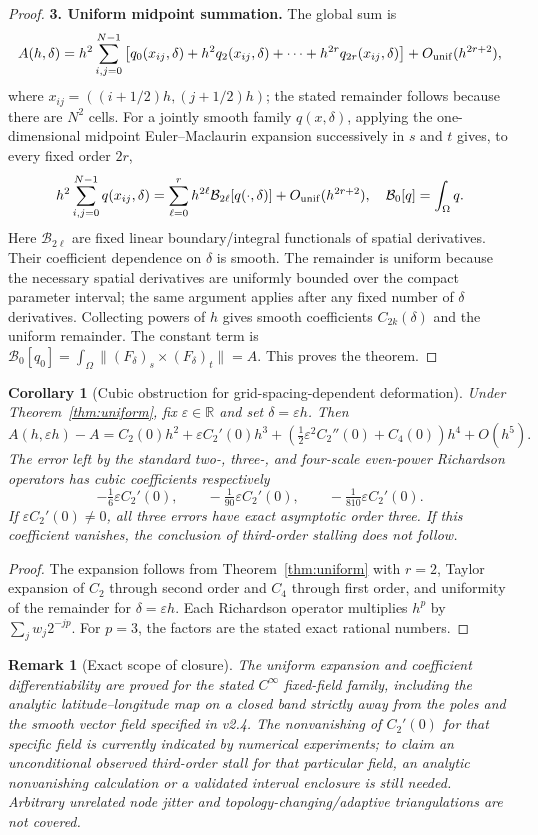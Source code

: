\documentclass[11pt]{article}
\newtheorem{corollary}{Corollary}
\newtheorem{remark}{Remark}
\begin{document}
\begin{proof}
\textbf{3. Uniform midpoint summation.} The global sum is
\[
A(h,\delta)=h^2\sum_{i,j=0}^{N-1}\left[q_0(x_{ij},\delta)+h^2q_2(x_{ij},\delta)+\cdots+h^{2r}q_{2r}(x_{ij},\delta)\right]+O_{\rm unif}(h^{2r+2}),
\]
where $x_{ij}=((i+1/2)h,(j+1/2)h)$; the stated remainder follows because there are $N^2$ cells. For a jointly smooth family $q(x,\delta)$, applying the one-dimensional midpoint Euler--Maclaurin expansion successively in $s$ and $t$ gives, to every fixed order $2r$,
\[
h^2\sum_{i,j=0}^{N-1}q(x_{ij},\delta)
=\sum_{\ell=0}^{r}h^{2\ell}\mathcal B_{2\ell}[q(\cdot,\delta)]+O_{\rm unif}(h^{2r+2}),\quad \mathcal B_0[q]=\int_\Omega q.
\]
Here $\mathcal B_{2\ell}$ are fixed linear boundary/integral functionals of spatial derivatives. Their coefficient dependence on $\delta$ is smooth. The remainder is uniform because the necessary spatial derivatives are uniformly bounded over the compact parameter interval; the same argument applies after any fixed number of $\delta$ derivatives.
Collecting powers of $h$ gives smooth coefficients $C_{2k}(\delta)$ and the uniform remainder. The constant term is $\mathcal B_0[q_0]=\int_\Omega\|(F_\delta)_s\times(F_\delta)_t\|=A$. This proves the theorem.
\end{proof}

\begin{corollary}[Cubic obstruction for grid-spacing-dependent deformation]\label{cor:cubic}
Under Theorem~\ref{thm:uniform}, fix $\varepsilon\in\mathbb R$ and set $\delta=\varepsilon h$. Then
\[
A(h,\varepsilon h)-A=C_2(0)h^2+\varepsilon C_2'(0)h^3+
\left(\tfrac12\varepsilon^2C_2''(0)+C_4(0)\right)h^4+O(h^5).
\]
The error left by the standard two-, three-, and four-scale even-power Richardson operators has cubic coefficients respectively
\[
-\tfrac16\varepsilon C_2'(0),\qquad -\tfrac1{90}\varepsilon C_2'(0),\qquad-\tfrac1{810}\varepsilon C_2'(0).
\]
If $\varepsilon C_2'(0)\ne0$, all three errors have \emph{exact} asymptotic order three. If this coefficient vanishes, the conclusion of third-order stalling does not follow.
\end{corollary}
\begin{proof}
The expansion follows from Theorem~\ref{thm:uniform} with $r=2$, Taylor expansion of $C_2$ through second order and $C_4$ through first order, and uniformity of the remainder for $\delta=\varepsilon h$. Each Richardson operator multiplies $h^p$ by $\sum_jw_j2^{-jp}$. For $p=3$, the factors are the stated exact rational numbers.
\end{proof}

\begin{remark}[Exact scope of closure]
The uniform expansion and coefficient differentiability are proved for the stated $C^\infty$ fixed-field family, including the analytic latitude--longitude map on a closed band strictly away from the poles and the smooth vector field specified in v2.4. The \emph{nonvanishing} of $C_2'(0)$ for that specific field is currently indicated by numerical experiments; to claim an unconditional observed third-order stall for that particular field, an analytic nonvanishing calculation or a validated interval enclosure is still needed. Arbitrary unrelated node jitter and topology-changing/adaptive triangulations are not covered.
\end{remark}
\end{document}
